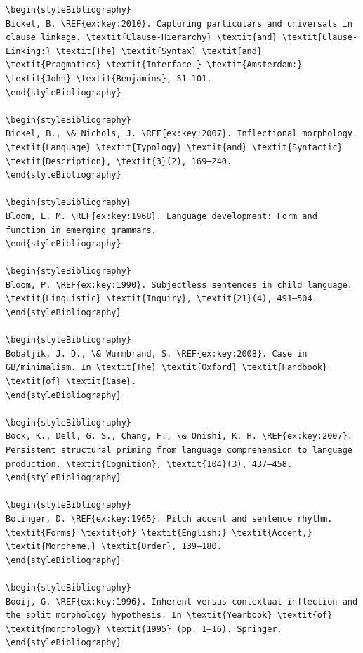 \begin{verbatim}
\begin{styleBibliography}
Bickel, B. \REF{ex:key:2010}. Capturing particulars and universals in clause linkage. \textit{Clause-Hierarchy} \textit{and} \textit{Clause-Linking:} \textit{The} \textit{Syntax} \textit{and} \textit{Pragmatics} \textit{Interface.} \textit{Amsterdam:} \textit{John} \textit{Benjamins}, 51–101.
\end{styleBibliography}

\begin{styleBibliography}
Bickel, B., \& Nichols, J. \REF{ex:key:2007}. Inflectional morphology. \textit{Language} \textit{Typology} \textit{and} \textit{Syntactic} \textit{Description}, \textit{3}(2), 169–240.
\end{styleBibliography}

\begin{styleBibliography}
Bloom, L. M. \REF{ex:key:1968}. Language development: Form and function in emerging grammars.
\end{styleBibliography}

\begin{styleBibliography}
Bloom, P. \REF{ex:key:1990}. Subjectless sentences in child language. \textit{Linguistic} \textit{Inquiry}, \textit{21}(4), 491–504.
\end{styleBibliography}

\begin{styleBibliography}
Bobaljik, J. D., \& Wurmbrand, S. \REF{ex:key:2008}. Case in GB/minimalism. In \textit{The} \textit{Oxford} \textit{Handbook} \textit{of} \textit{Case}.
\end{styleBibliography}

\begin{styleBibliography}
Bock, K., Dell, G. S., Chang, F., \& Onishi, K. H. \REF{ex:key:2007}. Persistent structural priming from language comprehension to language production. \textit{Cognition}, \textit{104}(3), 437–458.
\end{styleBibliography}

\begin{styleBibliography}
Bolinger, D. \REF{ex:key:1965}. Pitch accent and sentence rhythm. \textit{Forms} \textit{of} \textit{English:} \textit{Accent,} \textit{Morpheme,} \textit{Order}, 139–180.
\end{styleBibliography}

\begin{styleBibliography}
Booij, G. \REF{ex:key:1996}. Inherent versus contextual inflection and the split morphology hypothesis. In \textit{Yearbook} \textit{of} \textit{morphology} \textit{1995} (pp. 1–16). Springer.
\end{styleBibliography}


\end{verbatim}
